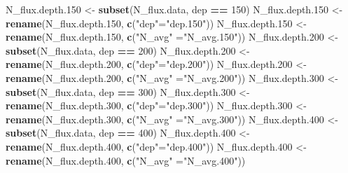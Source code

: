 \documentclass[]{article}
\newenvironment{Shaded}{\begin{snugshade}}{\end{snugshade}}
\newcommand{\DecValTok}[1]{\textcolor[rgb]{0.00,0.00,0.81}{#1}}
\newcommand{\FloatTok}[1]{\textcolor[rgb]{0.00,0.00,0.81}{#1}}
\newcommand{\KeywordTok}[1]{\textcolor[rgb]{0.13,0.29,0.53}{\textbf{#1}}}
\newcommand{\NormalTok}[1]{#1}
\newcommand{\OperatorTok}[1]{\textcolor[rgb]{0.81,0.36,0.00}{\textbf{#1}}}
\newcommand{\StringTok}[1]{\textcolor[rgb]{0.31,0.60,0.02}{#1}}
\begin{document}
\begin{Shaded}
\begin{Highlighting}[]
\NormalTok{N_flux.depth}\FloatTok{.150}\NormalTok{ <-}\StringTok{ }\KeywordTok{subset}\NormalTok{(N_flux.data, dep }\OperatorTok{==}\StringTok{ }\DecValTok{150}\NormalTok{)}
\NormalTok{N_flux.depth}\FloatTok{.150}\NormalTok{ <-}\StringTok{ }\KeywordTok{rename}\NormalTok{(N_flux.depth}\FloatTok{.150}\NormalTok{, }\KeywordTok{c}\NormalTok{(}\StringTok{"dep"}\NormalTok{=}\StringTok{"dep.150"}\NormalTok{))}
\NormalTok{N_flux.depth}\FloatTok{.150}\NormalTok{ <-}\StringTok{ }\KeywordTok{rename}\NormalTok{(N_flux.depth}\FloatTok{.150}\NormalTok{, }\KeywordTok{c}\NormalTok{(}\StringTok{"N_avg"}\NormalTok{ =}\StringTok{"N_avg.150"}\NormalTok{))}
\NormalTok{N_flux.depth}\FloatTok{.200}\NormalTok{ <-}\StringTok{ }\KeywordTok{subset}\NormalTok{(N_flux.data, dep }\OperatorTok{==}\StringTok{ }\DecValTok{200}\NormalTok{)}
\NormalTok{N_flux.depth}\FloatTok{.200}\NormalTok{ <-}\StringTok{ }\KeywordTok{rename}\NormalTok{(N_flux.depth}\FloatTok{.200}\NormalTok{, }\KeywordTok{c}\NormalTok{(}\StringTok{"dep"}\NormalTok{=}\StringTok{"dep.200"}\NormalTok{))}
\NormalTok{N_flux.depth}\FloatTok{.200}\NormalTok{ <-}\StringTok{ }\KeywordTok{rename}\NormalTok{(N_flux.depth}\FloatTok{.200}\NormalTok{, }\KeywordTok{c}\NormalTok{(}\StringTok{"N_avg"}\NormalTok{ =}\StringTok{"N_avg.200"}\NormalTok{))}
\NormalTok{N_flux.depth}\FloatTok{.300}\NormalTok{ <-}\StringTok{ }\KeywordTok{subset}\NormalTok{(N_flux.data, dep }\OperatorTok{==}\StringTok{ }\DecValTok{300}\NormalTok{)}
\NormalTok{N_flux.depth}\FloatTok{.300}\NormalTok{ <-}\StringTok{ }\KeywordTok{rename}\NormalTok{(N_flux.depth}\FloatTok{.300}\NormalTok{, }\KeywordTok{c}\NormalTok{(}\StringTok{"dep"}\NormalTok{=}\StringTok{"dep.300"}\NormalTok{))}
\NormalTok{N_flux.depth}\FloatTok{.300}\NormalTok{ <-}\StringTok{ }\KeywordTok{rename}\NormalTok{(N_flux.depth}\FloatTok{.300}\NormalTok{, }\KeywordTok{c}\NormalTok{(}\StringTok{"N_avg"}\NormalTok{ =}\StringTok{"N_avg.300"}\NormalTok{))}
\NormalTok{N_flux.depth}\FloatTok{.400}\NormalTok{ <-}\StringTok{ }\KeywordTok{subset}\NormalTok{(N_flux.data, dep }\OperatorTok{==}\StringTok{ }\DecValTok{400}\NormalTok{)}
\NormalTok{N_flux.depth}\FloatTok{.400}\NormalTok{ <-}\StringTok{ }\KeywordTok{rename}\NormalTok{(N_flux.depth}\FloatTok{.400}\NormalTok{, }\KeywordTok{c}\NormalTok{(}\StringTok{"dep"}\NormalTok{=}\StringTok{"dep.400"}\NormalTok{))}
\NormalTok{N_flux.depth}\FloatTok{.400}\NormalTok{ <-}\StringTok{ }\KeywordTok{rename}\NormalTok{(N_flux.depth}\FloatTok{.400}\NormalTok{, }\KeywordTok{c}\NormalTok{(}\StringTok{"N_avg"}\NormalTok{ =}\StringTok{"N_avg.400"}\NormalTok{))}
\end{Highlighting}
\end{Shaded}
\end{document}
